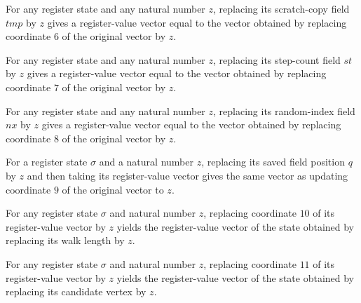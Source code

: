 \begin{lemma}
\label{Complexity.LogProg.UReg.u_6}
\leanok
{}
For any register state and any natural number $z$, replacing its scratch-copy field
$tmp$ by $z$ gives a register-value vector equal to the vector obtained by replacing
coordinate $6$ of the original vector by $z$.
\end{lemma}

\begin{lemma}
\label{Complexity.LogProg.UReg.u_7}
\leanok
{}
For any register state and any natural number $z$, replacing its step-count field $st$
by $z$ gives a register-value vector equal to the vector obtained by replacing
coordinate $7$ of the original vector by $z$.
\end{lemma}

\begin{lemma}
\label{Complexity.LogProg.UReg.u_8}
\leanok
{}
For any register state and any natural number $z$, replacing its random-index field $nx$
by $z$ gives a register-value vector equal to the vector obtained by replacing
coordinate $8$ of the original vector by $z$.
\end{lemma}

\begin{lemma}
\label{Complexity.LogProg.UReg.u_9}
\leanok
{}
For a register state $\sigma$ and a natural number $z$, replacing its saved field
position $q$ by $z$ and then taking its register-value vector gives the same vector as
updating coordinate $9$ of the original vector to $z$.
\end{lemma}

\begin{lemma}
\label{Complexity.LogProg.UReg.u_10}
\leanok
{}
For any register state $\sigma$ and natural number $z$, replacing coordinate $10$ of its
register-value vector by $z$ yields the register-value vector of the state obtained by
replacing its walk length by $z$.
\end{lemma}

\begin{lemma}
\label{Complexity.LogProg.UReg.u_11}
\leanok
{}
For any register state $\sigma$ and natural number $z$, replacing coordinate $11$ of its
register-value vector by $z$ yields the register-value vector of the state obtained by
replacing its candidate vertex by $z$.
\end{lemma}


